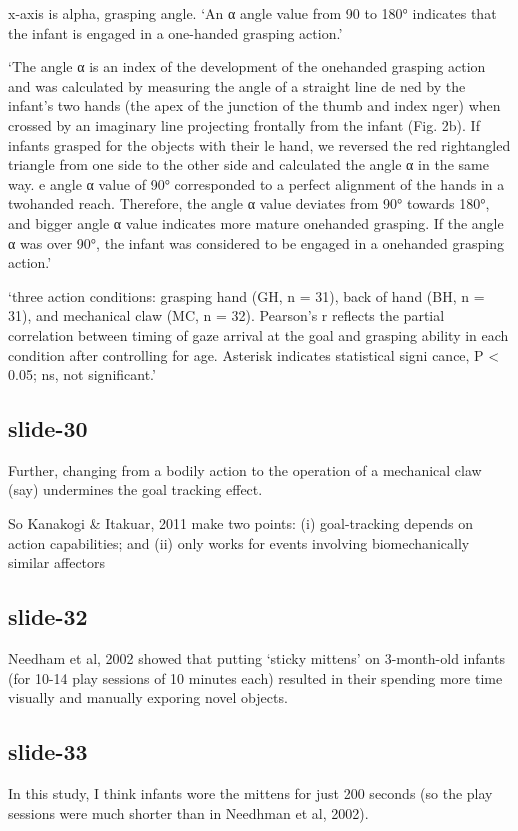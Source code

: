 \documentclass[12pt,\papersize]{extarticle}
\begin{document}
x-axis is alpha, grasping angle. ‘An α angle value from 90 to 180° indicates that the infant
is engaged in a one-handed grasping action.’
 
‘The angle α is an index of the development of the one­handed grasping action and was
calculated by measuring the angle of a straight line de ned by the infant’s two hands (the
apex of the junction of the thumb and index nger) when crossed by an imaginary line
projecting frontally from the infant (Fig. 2b). If infants grasped for the objects with their
le hand, we reversed the red right­angled triangle from one side to the other side and
calculated the angle α in the same way. e angle α value of 90° corresponded to a perfect
alignment of the hands in a two­handed reach. Therefore, the angle α value deviates from 90°
towards 180°, and bigger angle α value indicates more mature one­handed grasping. If the
angle α was over 90°, the infant was considered to be engaged in a one­handed grasping
action.’
 
‘three action conditions: grasping hand (GH, n = 31), back of hand (BH, n = 31), and
mechanical claw (MC, n = 32). Pearson’s r reflects the partial correlation between timing of
gaze arrival at the goal and grasping ability in each condition after controlling for age.
Asterisk indicates statistical signi cance, P < 0.05; ns, not significant.’
 
\subsection{slide-30}
Further, changing from a bodily action to the operation of a mechanical claw
(say) undermines the goal tracking effect.
 
So  Kanakogi \& Itakuar, 2011 make two points:
(i) goal-tracking depends on action capabilities; and 
(ii) only works for events involving biomechanically similar affectors
 
\subsection{slide-32}
Needham et al, 2002 showed that putting ‘sticky mittens’ on 3-month-old infants 
(for 10-14 play sessions of 10 minutes each) resulted in their spending 
more time visually and manually exporing novel objects.
 
\subsection{slide-33}
In this study, I think infants wore the mittens for just 200 seconds
(so the play sessions were much shorter than in Needhman et al, 2002).
 
\end{document}
